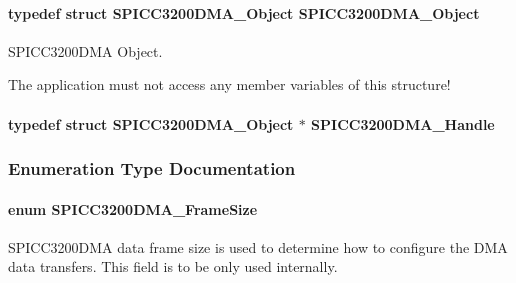 \paragraph[{S\-P\-I\-C\-C3200\-D\-M\-A\-\_\-\-Object}]{\setlength{\rightskip}{0pt plus 5cm}typedef struct {\bf S\-P\-I\-C\-C3200\-D\-M\-A\-\_\-\-Object}  {\bf S\-P\-I\-C\-C3200\-D\-M\-A\-\_\-\-Object}}\label{_s_p_i_c_c3200_d_m_a_8h_a5a581b5a475f9cd3e8b23355cc30ab7f}


S\-P\-I\-C\-C3200\-D\-M\-A Object. 

The application must not access any member variables of this structure! 
\paragraph[{S\-P\-I\-C\-C3200\-D\-M\-A\-\_\-\-Handle}]{\setlength{\rightskip}{0pt plus 5cm}typedef struct {\bf S\-P\-I\-C\-C3200\-D\-M\-A\-\_\-\-Object} $\ast$ {\bf S\-P\-I\-C\-C3200\-D\-M\-A\-\_\-\-Handle}}\label{_s_p_i_c_c3200_d_m_a_8h_ae757f6e0468145143c9c839a4e3cf353}


\subsubsection{Enumeration Type Documentation}
\paragraph[{S\-P\-I\-C\-C3200\-D\-M\-A\-\_\-\-Frame\-Size}]{\setlength{\rightskip}{0pt plus 5cm}enum {\bf S\-P\-I\-C\-C3200\-D\-M\-A\-\_\-\-Frame\-Size}}\label{_s_p_i_c_c3200_d_m_a_8h_a886c3ca11a73823e4f3ab5eefc0fbebb}


S\-P\-I\-C\-C3200\-D\-M\-A data frame size is used to determine how to configure the D\-M\-A data transfers. This field is to be only used internally. 

